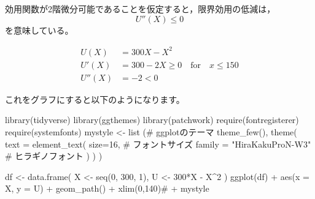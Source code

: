 \documentclass[
  letterpaper,
  pandoc,
  ja=standard,
  jafont = hiragino-pron]{ltjsbook}
\newenvironment{Shaded}{\begin{snugshade}}{\end{snugshade}}
\newcommand{\AttributeTok}[1]{\textcolor[rgb]{0.40,0.45,0.13}{#1}}
\newcommand{\CommentTok}[1]{\textcolor[rgb]{0.37,0.37,0.37}{#1}}
\newcommand{\DecValTok}[1]{\textcolor[rgb]{0.68,0.00,0.00}{#1}}
\newcommand{\FunctionTok}[1]{\textcolor[rgb]{0.28,0.35,0.67}{#1}}
\newcommand{\NormalTok}[1]{\textcolor[rgb]{0.00,0.23,0.31}{#1}}
\newcommand{\OtherTok}[1]{\textcolor[rgb]{0.00,0.23,0.31}{#1}}
\newcommand{\SpecialCharTok}[1]{\textcolor[rgb]{0.37,0.37,0.37}{#1}}
\newcommand{\StringTok}[1]{\textcolor[rgb]{0.13,0.47,0.30}{#1}}
\begin{document}
効用関数が2階微分可能であることを仮定すると，限界効用の低減は， \[
U''(X) \leq 0
\] を意味している。

\begin{tcolorbox}[enhanced jigsaw, colframe=quarto-callout-warning-color-frame, breakable, rightrule=.15mm, coltitle=black, title=\textcolor{quarto-callout-warning-color}{\faExclamationTriangle}\hspace{0.5em}{例3：性質1と性質2を満たす効用関数の例}, colbacktitle=quarto-callout-warning-color!10!white, leftrule=.75mm, colback=white, left=2mm, arc=.35mm, opacityback=0, titlerule=0mm, toptitle=1mm, bottomtitle=1mm, bottomrule=.15mm, toprule=.15mm, opacitybacktitle=0.6]

\[
\begin{aligned}
U(X)   &= 300 X - X^2\\
U'(X)  &= 300 - 2X \geq 0  \quad \mathrm{for } \quad x \leq 150\\
U''(X) &= -2 < 0
\end{aligned}
\]

\end{tcolorbox}

これをグラフにすると以下のようになります。

\begin{Shaded}
\begin{Highlighting}[]
\FunctionTok{library}\NormalTok{(tidyverse)}
\FunctionTok{library}\NormalTok{(ggthemes)}
\FunctionTok{library}\NormalTok{(patchwork)}
\FunctionTok{require}\NormalTok{(fontregisterer)}
\FunctionTok{require}\NormalTok{(systemfonts)}
\NormalTok{mystyle }\OtherTok{\textless{}{-}} \FunctionTok{list}\NormalTok{ (}\CommentTok{\#  ggplotのテーマ}
  \FunctionTok{theme\_few}\NormalTok{(),}
  \FunctionTok{theme}\NormalTok{(}
    \AttributeTok{text =} \FunctionTok{element\_text}\NormalTok{(}
      \AttributeTok{size=}\DecValTok{16}\NormalTok{,  }\CommentTok{\#  フォントサイズ}
     \AttributeTok{family =} \StringTok{"HiraKakuProN{-}W3"} \CommentTok{\# ヒラギノフォント}
\NormalTok{    )}
\NormalTok{  )}
\NormalTok{)}
\end{Highlighting}
\end{Shaded}

\begin{Shaded}
\begin{Highlighting}[]
\NormalTok{df }\OtherTok{\textless{}{-}} \FunctionTok{data.frame}\NormalTok{(}
\NormalTok{    X }\OtherTok{\textless{}{-}} \FunctionTok{seq}\NormalTok{(}\DecValTok{0}\NormalTok{, }\DecValTok{300}\NormalTok{, }\DecValTok{1}\NormalTok{),}
\NormalTok{    U }\OtherTok{\textless{}{-}} \DecValTok{300}\SpecialCharTok{*}\NormalTok{X }\SpecialCharTok{{-}}\NormalTok{ X}\SpecialCharTok{\^{}}\DecValTok{2}
\NormalTok{)}
\FunctionTok{ggplot}\NormalTok{(df) }\SpecialCharTok{+} \FunctionTok{aes}\NormalTok{(}\AttributeTok{x =}\NormalTok{ X, }\AttributeTok{y =}\NormalTok{ U) }\SpecialCharTok{+} \FunctionTok{geom\_path}\NormalTok{() }\SpecialCharTok{+} \FunctionTok{xlim}\NormalTok{(}\DecValTok{0}\NormalTok{,}\DecValTok{140}\NormalTok{)}\CommentTok{\# + mystyle}
\end{Highlighting}
\end{Shaded}
\end{document}
